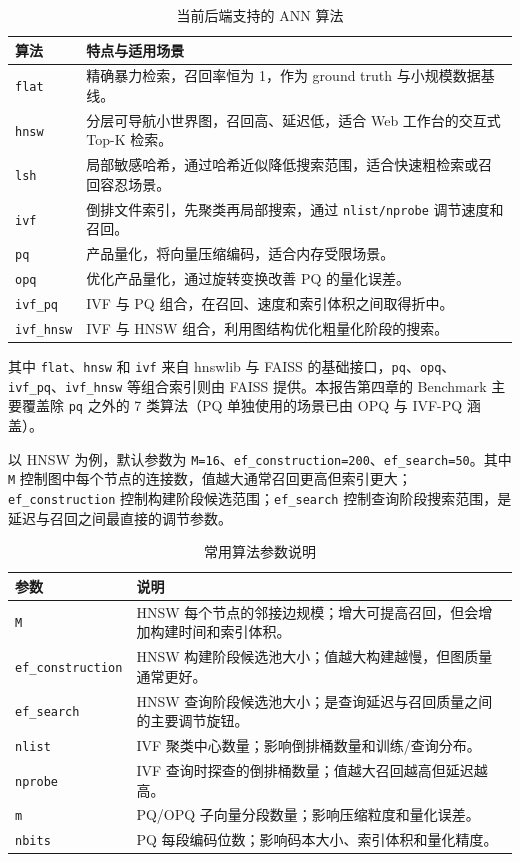 \documentclass[UTF8,a4paper,12pt]{ctexrep}
\begin{document}
\begin{table}[H]
  \centering
  \caption{当前后端支持的 ANN 算法}
  \begin{tabularx}{0.95\textwidth}{lY}
    \toprule
    算法 & 特点与适用场景 \\
    \midrule
    \texttt{flat} & 精确暴力检索，召回率恒为 1，作为 ground truth 与小规模数据基线。 \\
    \texttt{hnsw} & 分层可导航小世界图，召回高、延迟低，适合 Web 工作台的交互式 Top-K 检索。 \\
    \texttt{lsh} & 局部敏感哈希，通过哈希近似降低搜索范围，适合快速粗检索或召回容忍场景。 \\
    \texttt{ivf} & 倒排文件索引，先聚类再局部搜索，通过 \texttt{nlist/nprobe} 调节速度和召回。 \\
    \texttt{pq} & 产品量化，将向量压缩编码，适合内存受限场景。 \\
    \texttt{opq} & 优化产品量化，通过旋转变换改善 PQ 的量化误差。 \\
    \texttt{ivf\_pq} & IVF 与 PQ 组合，在召回、速度和索引体积之间取得折中。 \\
    \texttt{ivf\_hnsw} & IVF 与 HNSW 组合，利用图结构优化粗量化阶段的搜索。 \\
    \bottomrule
  \end{tabularx}
\end{table}

其中 \texttt{flat}、\texttt{hnsw} 和 \texttt{ivf} 来自 hnswlib 与 FAISS 的基础接口，\texttt{pq}、\texttt{opq}、\texttt{ivf\_pq}、\texttt{ivf\_hnsw} 等组合索引则由 FAISS 提供。本报告第四章的 Benchmark 主要覆盖除 \texttt{pq} 之外的 7 类算法（PQ 单独使用的场景已由 OPQ 与 IVF-PQ 涵盖）。

以 HNSW 为例，默认参数为 \texttt{M=16}、\texttt{ef\_construction=200}、\texttt{ef\_search=50}。其中 \texttt{M} 控制图中每个节点的连接数，值越大通常召回更高但索引更大；\texttt{ef\_construction} 控制构建阶段候选范围；\texttt{ef\_search} 控制查询阶段搜索范围，是延迟与召回之间最直接的调节参数。

\begin{table}[H]
  \centering
  \caption{常用算法参数说明}
  \begin{tabularx}{0.95\textwidth}{lY}
    \toprule
    参数 & 说明 \\
    \midrule
    \texttt{M} & HNSW 每个节点的邻接边规模；增大可提高召回，但会增加构建时间和索引体积。 \\
    \texttt{ef\_construction} & HNSW 构建阶段候选池大小；值越大构建越慢，但图质量通常更好。 \\
    \texttt{ef\_search} & HNSW 查询阶段候选池大小；是查询延迟与召回质量之间的主要调节旋钮。 \\
    \texttt{nlist} & IVF 聚类中心数量；影响倒排桶数量和训练/查询分布。 \\
    \texttt{nprobe} & IVF 查询时探查的倒排桶数量；值越大召回越高但延迟越高。 \\
    \texttt{m} & PQ/OPQ 子向量分段数量；影响压缩粒度和量化误差。 \\
    \texttt{nbits} & PQ 每段编码位数；影响码本大小、索引体积和量化精度。 \\
    \bottomrule
  \end{tabularx}
\end{table}
\end{document}
